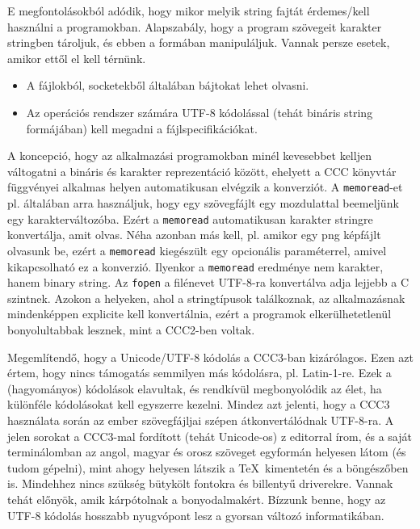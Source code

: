 E megfontolásokból adódik, hogy mikor melyik string 
fajtát érdemes/kell használni a programokban.
Alapszabály, hogy a program szövegeit karakter stringben
tároljuk, és ebben a formában manipuláljuk. 
Vannak persze esetek, amikor ettől el kell térnünk.
\begin{itemize}
\item 
    A fájlokból, socketekből általában bájtokat lehet olvasni.
\item
    Az operációs rendszer számára UTF-8 kódolással 
    (tehát bináris string formájában) kell megadni a 
    fájlspecifikációkat.
\end{itemize}
A koncepció, hogy az alkalmazási programokban minél
kevesebbet kelljen váltogatni a bináris és karakter
reprezentáció között, ehelyett a CCC könyvtár függvényei
alkalmas helyen automatikusan elvégzik a konverziót.
A \verb!memoread!-et pl. általában arra használjuk,
hogy egy szövegfájlt egy mozdulattal beemeljünk  egy karakterváltozóba.
Ezért a \verb!memoread! automatikusan karakter stringre
konvertálja, amit olvas. Néha azonban más kell, pl. amikor
egy png képfájlt olvasunk be, ezért a \verb!memoread!
kiegészült egy opcionális paraméterrel, amivel kikapcsolható
ez a konverzió. Ilyenkor a \verb!memoread! eredménye nem 
karakter, hanem binary string.
Az \verb!fopen! a filénevet UTF-8-ra konvertálva adja 
lejjebb a C szintnek. 
Azokon a helyeken, ahol a stringtípusok találkoznak,
az alkalmazásnak mindenképpen explicite kell konvertálnia, 
ezért a programok elkerülhetetlenül bonyolultabbak lesznek, 
mint a CCC2-ben voltak.

Megemlítendő, hogy a Unicode/UTF-8 kódolás a CCC3-ban kizárólagos.
Ezen azt értem, hogy nincs támogatás semmilyen más kódolásra,
pl. Latin-1-re. Ezek a (hagyományos) kódolások elavultak,
és rendkívül megbonyolódik az élet, ha különféle kódolásokat
kell egyszerre kezelni. Mindez azt jelenti, hogy a CCC3 használata 
során az ember szövegfájljai szépen átkonvertálódnak UTF-8-ra.
A jelen sorokat a CCC3-mal fordított (tehát Unicode-os) z editorral írom,
és a saját terminálomban az angol, magyar és orosz szöveget
egyformán helyesen látom (és tudom gépelni), mint ahogy helyesen
látszik a \TeX\  kimentetén és a böngészőben is. Mindehhez
nincs szükség bütykölt fontokra és billentyű driverekre.
Vannak tehát előnyök, amik kárpótolnak a bonyodalmakért. 
Bízzunk benne, hogy az UTF-8 kódolás hosszabb nyugvópont lesz 
a gyorsan változó informatikában.







